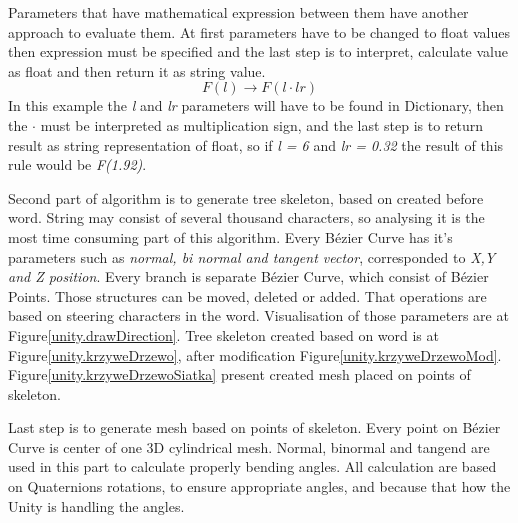 \documentclass[b5paper,twoside,11pt]{article}
\renewcommand{\figurename}{Figure}
\begin{document}
  Parameters that have mathematical expression between them have another approach to evaluate them. At first parameters have to be changed to float values then expression must be specified and the last step is to interpret, calculate value as float and then return it as string value.
  \begin{equation}
  F(l) \rightarrow F(l \cdot lr)
  \end{equation}
  In this example the \textit{l} and \textit{lr} parameters will have to be found in Dictionary, then the $ \cdot$ must be interpreted as multiplication sign, and the last step is to return result as string representation of float, so if \textit{l = 6} and \textit{lr = 0.32} the result of this rule would be \textit{F(1.92)}.\par
Second part of algorithm is to generate tree skeleton, based on created before word. String may consist of several thousand characters, so analysing it is the most time consuming part of this algorithm.
Every Bézier Curve has it's parameters such as \textit{normal, bi normal and tangent vector}, corresponded to \textit{X,Y and Z position}. Every branch is separate Bézier Curve, which consist of Bézier Points. Those structures can be moved, deleted or added. That operations are based on steering characters in the word.
Visualisation of those parameters are at \figurename\ref{unity.drawDirection}. Tree skeleton created based on word is at \figurename\ref{unity.krzyweDrzewo}, after modification  \figurename\ref{unity.krzyweDrzewoMod}. \figurename\ref{unity.krzyweDrzewoSiatka} present created mesh placed on points of skeleton.
\par
Last step is to generate  mesh based on points of skeleton. Every point on Bézier Curve is center of one 3D cylindrical mesh. Normal, binormal and tangend are used in this part to calculate properly bending angles.
All calculation are based on Quaternions rotations, to ensure appropriate angles, and because that how the Unity is handling the angles.
\end{document}
